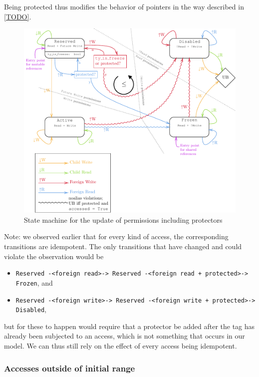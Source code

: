 \documentclass[a4paper,11pt]{article}
\theoremstyle{plain}
\theoremstyle{definition}
\theoremstyle{remark}
\newcommand{\tperm}[1]{\texttt{#1}}
\begin{document}
Being protected thus modifies the behavior of pointers in the way described in \ref{TODO}.

\begin{figure}
    \includegraphics[width=\textwidth]{../figs/state-machine.pdf}
    \caption{State machine for the update of permissions including protectors}
    \label{fig:state-machine}
\end{figure}

Note: we observed earlier that for every kind of access, the corresponding transitions
are idempotent. The only transitions that have changed and could violate the observation would be

\begin{itemize}
    \item \tperm{Reserved -<foreign read>-> Reserved -<foreign read + protected>-> Frozen}, and
    \item \tperm{Reserved -<foreign write>-> Reserved -<foreign write + protected>-> Disabled},
\end{itemize}

but for these to happen would require that a protector be added after the tag has already been
subjected to an access, which is not something that occurs in our model.
We can thus still rely on the effect of every access being idempotent.

\subsubsection{Accesses outside of initial range}
\end{document}
